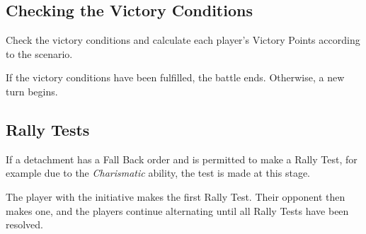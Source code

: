 \subsection{Checking the Victory Conditions}

Check the victory conditions and calculate each player's Victory Points according to the scenario.

If the victory conditions have been fulfilled, the battle ends. Otherwise, a new turn begins.

\subsection{Rally Tests}

If a detachment has a Fall Back order and is permitted to make a Rally Test, for example due to the \textit{Charismatic} ability, the test is made at this stage.

The player with the initiative makes the first Rally Test. Their opponent then makes one, and the players continue alternating until all Rally Tests have been resolved.